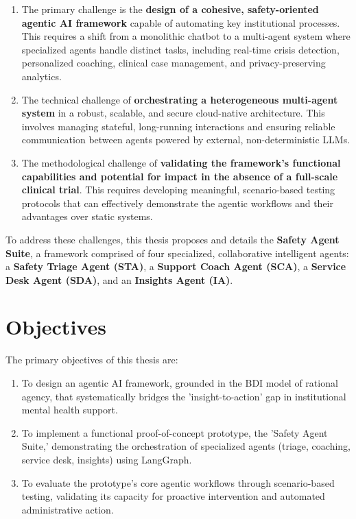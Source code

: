 \begin{enumerate}
    \item The primary challenge is the \textbf{design of a cohesive, safety-oriented agentic AI framework} capable of automating key institutional processes. This requires a shift from a monolithic chatbot to a multi-agent system where specialized agents handle distinct tasks, including real-time crisis detection, personalized coaching, clinical case management, and privacy-preserving analytics.

    \item The technical challenge of \textbf{orchestrating a heterogeneous multi-agent system} in a robust, scalable, and secure cloud-native architecture. This involves managing stateful, long-running interactions and ensuring reliable communication between agents powered by external, non-deterministic LLMs.

    \item The methodological challenge of \textbf{validating the framework's functional capabilities and potential for impact in the absence of a full-scale clinical trial}. This requires developing meaningful, scenario-based testing protocols that can effectively demonstrate the agentic workflows and their advantages over static systems.
\end{enumerate}

To address these challenges, this thesis proposes and details the \textbf{Safety Agent Suite}, a framework comprised of four specialized, collaborative intelligent agents: a \textbf{Safety Triage Agent (STA)}, a \textbf{Support Coach Agent (SCA)}, a \textbf{Service Desk Agent (SDA)}, and an \textbf{Insights Agent (IA)}.


\section{Objectives}
\label{sec:objectives}

The primary objectives of this thesis are:
\begin{enumerate}
    \item To design an agentic AI framework, grounded in the BDI model of rational agency, that systematically bridges the 'insight-to-action' gap in institutional mental health support.
    \item To implement a functional proof-of-concept prototype, the 'Safety Agent Suite,' demonstrating the orchestration of specialized agents (triage, coaching, service desk, insights) using LangGraph.
    \item To evaluate the prototype's core agentic workflows through scenario-based testing, validating its capacity for proactive intervention and automated administrative action.
\end{enumerate}

